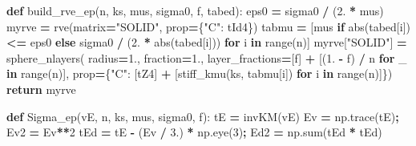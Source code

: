\documentclass[
  a4paper,
  numbers=noendperiod,
  DIV=12]{scrreprt}
\newenvironment{Shaded}{\begin{snugshade}}{\end{snugshade}}
\newcommand{\BuiltInTok}[1]{#1}
\newcommand{\ControlFlowTok}[1]{\textcolor[rgb]{0.13,0.29,0.53}{\textbf{#1}}}
\newcommand{\DecValTok}[1]{\textcolor[rgb]{0.00,0.00,0.81}{#1}}
\newcommand{\FloatTok}[1]{\textcolor[rgb]{0.00,0.00,0.81}{#1}}
\newcommand{\KeywordTok}[1]{\textcolor[rgb]{0.13,0.29,0.53}{\textbf{#1}}}
\newcommand{\NormalTok}[1]{#1}
\newcommand{\OperatorTok}[1]{\textcolor[rgb]{0.81,0.36,0.00}{\textbf{#1}}}
\newcommand{\StringTok}[1]{\textcolor[rgb]{0.31,0.60,0.02}{#1}}
\begin{document}
\begin{Shaded}
\begin{Highlighting}[]
\KeywordTok{def}\NormalTok{ build\_rve\_ep(n, ks, mus, sigma0, f, tabed):}
\NormalTok{    eps0 }\OperatorTok{=}\NormalTok{ sigma0 }\OperatorTok{/}\NormalTok{ (}\FloatTok{2.} \OperatorTok{*}\NormalTok{ mus)}
\NormalTok{    myrve }\OperatorTok{=}\NormalTok{ rve(matrix}\OperatorTok{=}\StringTok{"SOLID"}\NormalTok{, prop}\OperatorTok{=}\NormalTok{\{}\StringTok{"C"}\NormalTok{: tId4\})}
\NormalTok{    tabmu }\OperatorTok{=}\NormalTok{ [mus }\ControlFlowTok{if} \BuiltInTok{abs}\NormalTok{(tabed[i]) }\OperatorTok{\textless{}=}\NormalTok{ eps0}
             \ControlFlowTok{else}\NormalTok{ sigma0 }\OperatorTok{/}\NormalTok{ (}\FloatTok{2.} \OperatorTok{*} \BuiltInTok{abs}\NormalTok{(tabed[i])) }\ControlFlowTok{for}\NormalTok{ i }\KeywordTok{in} \BuiltInTok{range}\NormalTok{(n)]}
\NormalTok{    myrve[}\StringTok{"SOLID"}\NormalTok{] }\OperatorTok{=}\NormalTok{ sphere\_nlayers(}
\NormalTok{        radius}\OperatorTok{=}\FloatTok{1.}\NormalTok{, fraction}\OperatorTok{=}\FloatTok{1.}\NormalTok{,}
\NormalTok{        layer\_fractions}\OperatorTok{=}\NormalTok{[f] }\OperatorTok{+}\NormalTok{ [(}\FloatTok{1.} \OperatorTok{{-}}\NormalTok{ f) }\OperatorTok{/}\NormalTok{ n }\ControlFlowTok{for}\NormalTok{ \_ }\KeywordTok{in} \BuiltInTok{range}\NormalTok{(n)],}
\NormalTok{        prop}\OperatorTok{=}\NormalTok{\{}\StringTok{"C"}\NormalTok{: [tZ4] }\OperatorTok{+}\NormalTok{ [stiff\_kmu(ks, tabmu[i]) }\ControlFlowTok{for}\NormalTok{ i }\KeywordTok{in} \BuiltInTok{range}\NormalTok{(n)]\})}
    \ControlFlowTok{return}\NormalTok{ myrve}

\KeywordTok{def}\NormalTok{ Sigma\_ep(vE, n, ks, mus, sigma0, f):}
\NormalTok{    tE }\OperatorTok{=}\NormalTok{ invKM(vE)}
\NormalTok{    Ev }\OperatorTok{=}\NormalTok{ np.trace(tE)}\OperatorTok{;}\NormalTok{ Ev2 }\OperatorTok{=}\NormalTok{ Ev}\OperatorTok{**}\DecValTok{2}
\NormalTok{    tEd }\OperatorTok{=}\NormalTok{ tE }\OperatorTok{{-}}\NormalTok{ (Ev }\OperatorTok{/} \FloatTok{3.}\NormalTok{) }\OperatorTok{*}\NormalTok{ np.eye(}\DecValTok{3}\NormalTok{)}\OperatorTok{;}\NormalTok{ Ed2 }\OperatorTok{=}\NormalTok{ np.}\BuiltInTok{sum}\NormalTok{(tEd }\OperatorTok{*}\NormalTok{ tEd)}


\end{Highlighting}
\end{Shaded}
\end{document}
